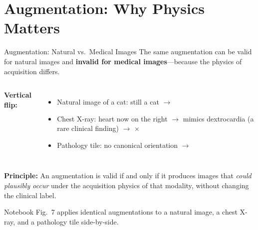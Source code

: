 \documentclass[aspectratio=169,10pt]{beamer}
\begin{document}
\section{Augmentation: Why Physics Matters}

\begin{frame}{Augmentation: Natural vs.\ Medical Images}
The same augmentation can be valid for natural images and \textbf{invalid for medical images}---because the physics of acquisition differs.

\vspace{0.2em}
\begin{columns}[T]
\textbf{Vertical flip:}
\begin{itemize}
    \item Natural image of a cat: still a cat $\to$ \textcolor{hlgreen}{\checkmark}
    \item Chest X-ray: heart now on the right $\to$ mimics dextrocardia (a rare clinical finding) $\to$ \textcolor{columbiaaccent}{$\times$}
    \item Pathology tile: no canonical orientation $\to$ \textcolor{hlgreen}{\checkmark}
\end{itemize}

\end{columns}

\vspace{0.2em}
\textbf{Principle:} An augmentation is valid if and only if it produces images that \emph{could plausibly occur} under the acquisition physics of that modality, without changing the clinical label.

{\small Notebook Fig.~7 applies identical augmentations to a natural image, a chest X-ray, and a pathology tile side-by-side.}
\end{frame}
\end{document}
